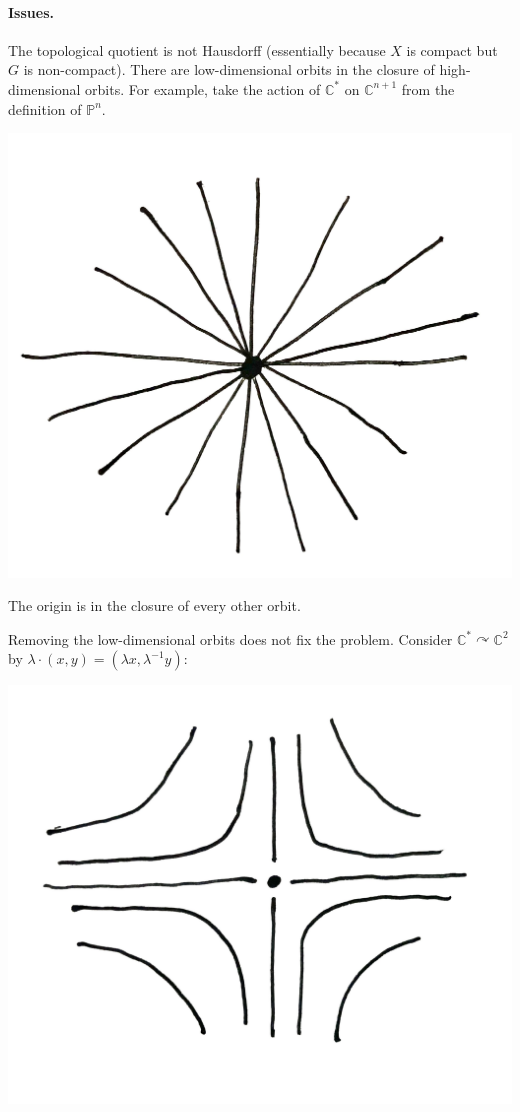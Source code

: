 \documentclass{article}
\theoremstyle{definition}
\renewcommand{\P}{\mathbb{P}}
\newcommand{\C}{\mathbb{C}}
\begin{document}
\paragraph{Issues.} The topological quotient is not Hausdorff (essentially
because $X$ is compact but $G$ is non-compact). There are low-dimensional orbits
in the closure of high-dimensional orbits. For example, take the action of
$\C^*$ on $\C^{n+1}$ from the definition of $\P^n$.
\begin{center}
    \includegraphics[scale=0.03]{git_node}
\end{center}

The origin is in the closure of every other orbit.

Removing the low-dimensional orbits does not fix the problem. Consider
$\C^*\curvearrowright\C^2$ by $\lambda\cdot(x,y)=(\lambda x,\lambda^{-1}y)$:
\begin{center}
    \includegraphics[scale=0.03]{git_saddle}
\end{center}
\end{document}
